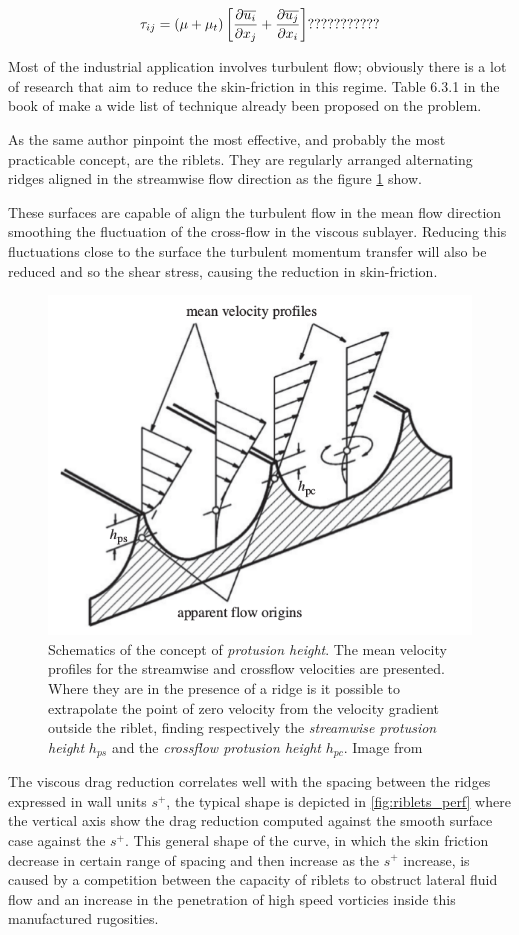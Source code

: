 $$
\tau_{ij} = \left( \mu + \mu_t \right) \left[ \frac{\partial \overline{u_i}}{\partial x_j} + \frac{\partial \overline{u_j}}{\partial x_i}\right] ???????????
$$

Most of the industrial application involves turbulent flow; obviously there is a lot of research that aim to reduce the skin-friction in this regime.
Table 6.3.1 in the book of \citet{mclean2012understanding} make a wide list of technique already been proposed on the problem.

As the same author pinpoint the most effective, and probably the most practicable concept, are the riblets.
They are regularly arranged alternating ridges aligned in the streamwise flow direction as the figure \ref{fig:riblets1} show.

These surfaces are capable of align the turbulent flow in the mean flow direction smoothing the fluctuation of the cross-flow in the viscous sublayer.
Reducing this fluctuations close to the surface the turbulent momentum transfer will also be reduced and so the shear stress, causing the reduction in skin-friction.

\begin{figure}[h]
	\centering
	\includegraphics[width=0.7\linewidth]{chapter_1/riblets3}
	\caption{Schematics of the concept of \textit{protusion height}. The mean velocity profiles for the streamwise and crossflow velocities are presented. Where they are in the presence of a ridge is it possible to extrapolate the point of zero velocity from the velocity gradient outside the riblet, finding respectively the \textit{streamwise protusion height} $h_{ps}$ and the \textit{crossflow protusion height} $h_{pc}$. Image from \citet{bechert1997experiments}}
	\label{fig:riblets1}
\end{figure}


The viscous drag reduction correlates well with the spacing between the ridges expressed in wall units $ s^+ $, the typical shape is depicted in \ref{fig:riblets_perf} where the vertical axis show the drag reduction computed against the smooth surface case against the $ s^+ $.
This general shape of the curve, in which the skin friction decrease in certain range of spacing and then increase as the $ s^+ $ increase, is caused by a competition between the capacity of riblets to obstruct lateral fluid flow and an increase in the penetration of high speed vorticies inside this manufactured rugosities.

